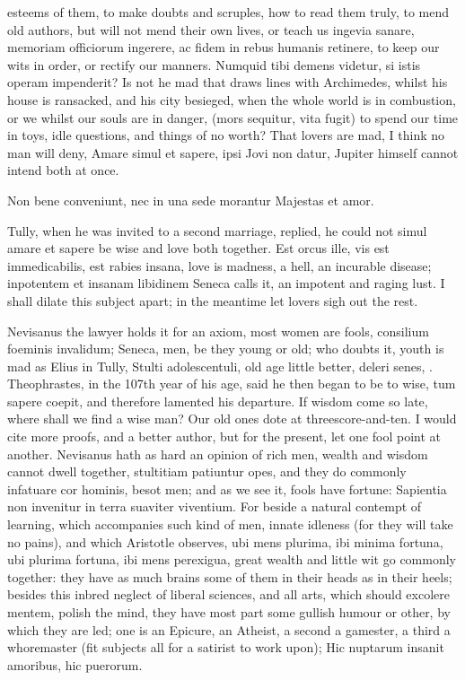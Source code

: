 {esteems of them, to make doubts and scruples, how to read them truly,
to mend old authors, but will not mend their own lives, or teach us
ingevia sanare, memoriam officiorum ingerere, ac fidem in rebus humanis
retinere, to keep our wits in order, or rectify our manners. Numquid
tibi demens videtur, si istis operam impenderit? Is not he mad that
draws lines with Archimedes, whilst his house is ransacked, and his
city besieged, when the whole world is in combustion, or we whilst our
souls are in danger, (mors sequitur, vita fugit) to spend our time in
toys, idle questions, and things of no worth?
That lovers are mad, I think no man will deny, Amare simul et
sapere, ipsi Jovi non datur, Jupiter himself cannot intend both at
once.

Non bene conveniunt, nec in una sede morantur
Majestas et amor.

Tully, when he was invited to a second marriage, replied, he could not
simul amare et sapere be wise and love both together. Est orcus
ille, vis est immedicabilis, est rabies insana, love is madness, a
hell, an incurable disease; inpotentem et insanam libidinem Seneca
calls it, an impotent and raging lust. I shall dilate this subject
apart; in the meantime let lovers sigh out the rest.

Nevisanus the lawyer holds it for an axiom, most women are fools,
consilium foeminis invalidum; Seneca, men, be they young or old;
who doubts it, youth is mad as Elius in Tully, Stulti adolescentuli,
old age little better, deleri senes, \etc{}. Theophrastes, in the 107th
year of his age, said he then began to be to wise, tum sapere
coepit, and therefore lamented his departure. If wisdom come so late,
where shall we find a wise man? Our old ones dote at
threescore-and-ten. I would cite more proofs, and a better author, but
for the present, let one fool point at another. Nevisanus hath as
hard an opinion of rich men, wealth and wisdom cannot dwell
together, stultitiam patiuntur opes, and they do commonly
infatuare cor hominis, besot men; and as we see it, fools have
fortune: Sapientia non invenitur in terra suaviter viventium. For
beside a natural contempt of learning, which accompanies such kind of
men, innate idleness (for they will take no pains), and which
Aristotle observes, ubi mens plurima, ibi minima fortuna, ubi
plurima fortuna, ibi mens perexigua, great wealth and little wit go
commonly together: they have as much brains some of them in their heads
as in their heels; besides this inbred neglect of liberal sciences, and
all arts, which should excolere mentem, polish the mind, they have most
part some gullish humour or other, by which they are led; one is an
Epicure, an Atheist, a second a gamester, a third a whoremaster (fit
subjects all for a satirist to work upon);
Hic nuptarum insanit amoribus, hic puerorum.

}

